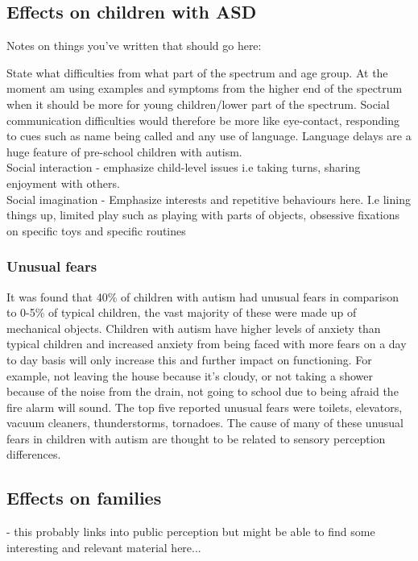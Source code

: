 \documentclass[11pt]{report}
\begin{document}
\subsection{Effects on children with ASD}

Notes on things you've written that should go here:

State what difficulties from what part of the spectrum and age group. At the moment am using examples and symptoms from the higher end of the spectrum when it should be more for young children/lower part of the spectrum. Social communication difficulties would therefore be more like eye-contact, responding to cues such as name being called and any use of language. Language delays are a huge feature of pre-school children with autism.\\
Social interaction - emphasize child-level issues i.e taking turns, sharing enjoyment with others.\\
Social imagination - Emphasize interests and repetitive behaviours here. I.e lining things up, limited play such as playing with parts of objects, obsessive fixations on specific toys and specific routines\\

\subsubsection{Unusual fears}
It was found that 40\% of children with autism had unusual fears in comparison to 0-5\% of typical children, the vast majority of these were made up of mechanical objects. Children with autism have higher levels of anxiety than typical children\cite{fears} and increased anxiety from being faced with more fears on a day to day basis will only increase this and further impact on functioning. For example, not leaving the house because it's cloudy, or not taking a shower because of the noise from the drain, not going to school due to being afraid the fire alarm will sound. The top five reported unusual fears were toilets, elevators, vacuum cleaners, thunderstorms, tornadoes. The cause of many of these unusual fears in children with autism are thought to be related to sensory perception differences\cite{fears}.

\subsection{Effects on families}
- this probably links into public perception but might be able to find some interesting and relevant material here...
\end{document}
